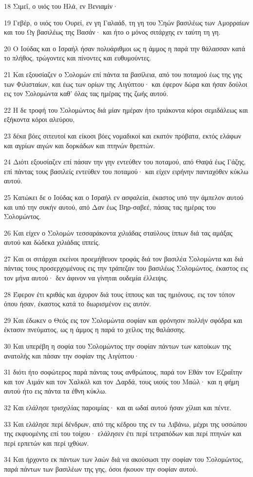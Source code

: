 \par 18 Σιμεΐ, ο υιός του Ηλά, εν Βενιαμίν·
\par 19 Γεβέρ, ο υιός του Ουρεί, εν γη Γαλαάδ, τη γη του Σηών βασιλέως των Αμορραίων και του Ωγ βασιλέως της Βασάν· και ήτο ο μόνος σιτάρχης εν ταύτη τη γη.
\par 20 Ο Ιούδας και ο Ισραήλ ήσαν πολυάριθμοι ως η άμμος η παρά την θάλασσαν κατά το πλήθος, τρώγοντες και πίνοντες και ευθυμούντες.
\par 21 Και εξουσίαζεν ο Σολομών επί πάντα τα βασίλεια, από του ποταμού έως της γης των Φιλισταίων, και έως των ορίων της Αιγύπτου· και έφερον δώρα και ήσαν δούλοι εις τον Σολομώντα καθ' όλας τας ημέρας της ζωής αυτού.
\par 22 Η δε τροφή του Σολομώντος διά μίαν ημέραν ήτο τριάκοντα κόροι σεμιδάλεως και εξήκοντα κόροι αλεύρου,
\par 23 δέκα βόες σιτευτοί και είκοσι βόες νομαδικοί και εκατόν πρόβατα, εκτός ελάφων και αγρίων αιγών και δορκάδων και πτηνών θρεπτών.
\par 24 Διότι εξουσίαζεν επί πάσαν την γην εντεύθεν του ποταμού, από Θαψά έως Γάζης, επί πάντας τους βασιλείς εντεύθεν του ποταμού· και είχεν ειρήνην πανταχόθεν κύκλω αυτού.
\par 25 Κατώκει δε ο Ιούδας και ο Ισραήλ εν ασφαλεία, έκαστος υπό την άμπελον αυτού και υπό την συκήν αυτού, από Δαν έως Βηρ-σαβεέ, πάσας τας ημέρας του Σολομώντος.
\par 26 Και είχεν ο Σολομών τεσσαράκοντα χιλιάδας σταύλους ίππων διά τας αμάξας αυτού και δώδεκα χιλιάδας ιππείς.
\par 27 Και οι σιτάρχαι εκείνοι προεμήθευον τροφάς διά τον βασιλέα Σολομώντα και διά πάντας τους προσερχομένους εις την τράπεζαν του βασιλέως Σολομώντος, έκαστος εις τον μήνα αυτού· δεν άφινον να γίνηται ουδεμία έλλειψις.
\par 28 Έφερον έτι κριθάς και άχυρον διά τους ίππους και τας ημιόνους, εις τον τόπον όπου ήσαν, έκαστος κατά το διωρισμένον εις αυτόν.
\par 29 Και έδωκεν ο Θεός εις τον Σολομώντα σοφίαν και φρόνησιν πολλήν σφόδρα και έκτασιν πνεύματος, ως η άμμος η παρά το χείλος της θαλάσσης.
\par 30 Και υπερέβη η σοφία του Σολομώντος την σοφίαν πάντων των κατοίκων της ανατολής και πάσαν την σοφίαν της Αιγύπτου·
\par 31 διότι ήτο σοφώτερος παρά πάντας τους ανθρώπους, παρά τον Εθάν τον Εζραΐτην και τον Αιμάν και τον Χαλκόλ και τον Δαρδά, τους υιούς του Μαώλ· και η φήμη αυτού ήτο εις πάντα τα έθνη κύκλω.
\par 32 Και ελάλησε τρισχιλίας παροιμίας· και αι ωδαί αυτού ήσαν χίλιαι και πέντε.
\par 33 Και ελάλησε περί δένδρων, από της κέδρου της εν τω Λιβάνω, μέχρι της υσσώπου της εκφυομένης επί του τοίχου· ελάλησεν έτι περί τετραπόδων και περί πτηνών και περί ερπετών και περί ιχθύων.
\par 34 Και ήρχοντο εκ πάντων των λαών διά να ακούσωσι την σοφίαν του Σολομώντος, παρά πάντων των βασιλέων της γης, όσοι ήκουον την σοφίαν αυτού.

